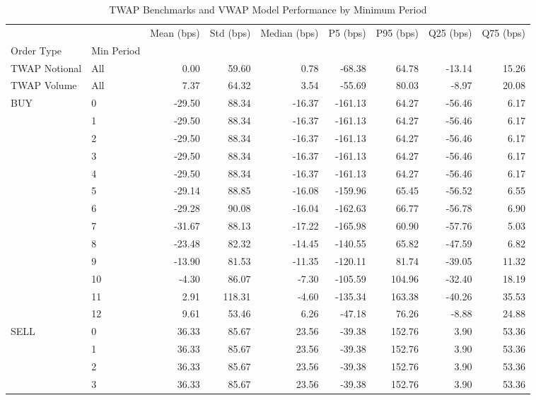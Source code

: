 \begin{table}
\caption{TWAP Benchmarks and VWAP Model Performance by Minimum Period}
\label{tab:comprehensive_performance}
\begin{tabular}{l|l|rrrrrrr}
\toprule
 &  & Mean (bps) & Std (bps) & Median (bps) & P5 (bps) & P95 (bps) & Q25 (bps) & Q75 (bps) \\
Order Type & Min Period &  &  &  &  &  &  &  \\
\midrule
TWAP Notional & All & 0.00 & 59.60 & 0.78 & -68.38 & 64.78 & -13.14 & 15.26 \\
\cline{1-9}
TWAP Volume & All & 7.37 & 64.32 & 3.54 & -55.69 & 80.03 & -8.97 & 20.08 \\
\cline{1-9}
\multirow[t]{13}{*}{BUY} & 0 & -29.50 & 88.34 & -16.37 & -161.13 & 64.27 & -56.46 & 6.17 \\
 & 1 & -29.50 & 88.34 & -16.37 & -161.13 & 64.27 & -56.46 & 6.17 \\
 & 2 & -29.50 & 88.34 & -16.37 & -161.13 & 64.27 & -56.46 & 6.17 \\
 & 3 & -29.50 & 88.34 & -16.37 & -161.13 & 64.27 & -56.46 & 6.17 \\
 & 4 & -29.50 & 88.34 & -16.37 & -161.13 & 64.27 & -56.46 & 6.17 \\
 & 5 & -29.14 & 88.85 & -16.08 & -159.96 & 65.45 & -56.52 & 6.55 \\
 & 6 & -29.28 & 90.08 & -16.04 & -162.63 & 66.77 & -56.78 & 6.90 \\
 & 7 & -31.67 & 88.13 & -17.22 & -165.98 & 60.90 & -57.76 & 5.03 \\
 & 8 & -23.48 & 82.32 & -14.45 & -140.55 & 65.82 & -47.59 & 6.82 \\
 & 9 & -13.90 & 81.53 & -11.35 & -120.11 & 81.74 & -39.05 & 11.32 \\
 & 10 & -4.30 & 86.07 & -7.30 & -105.59 & 104.96 & -32.40 & 18.19 \\
 & 11 & 2.91 & 118.31 & -4.60 & -135.34 & 163.38 & -40.26 & 35.53 \\
 & 12 & 9.61 & 53.46 & 6.26 & -47.18 & 76.26 & -8.88 & 24.88 \\
\cline{1-9}
\multirow[t]{13}{*}{SELL} & 0 & 36.33 & 85.67 & 23.56 & -39.38 & 152.76 & 3.90 & 53.36 \\
 & 1 & 36.33 & 85.67 & 23.56 & -39.38 & 152.76 & 3.90 & 53.36 \\
 & 2 & 36.33 & 85.67 & 23.56 & -39.38 & 152.76 & 3.90 & 53.36 \\
 & 3 & 36.33 & 85.67 & 23.56 & -39.38 & 152.76 & 3.90 & 53.36 \\

\end{tabular}
\end{table}
